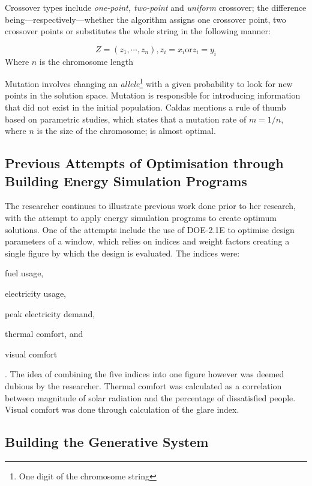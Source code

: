Crossover types include \emph{one-point, two-point} and \emph{uniform} crossover; the difference being---respectively---whether the algorithm assigns one crossover point, two crossover points or substitutes the whole string in the following manner:

\begin{equation}
Z=(z_1,\cdots,z_n), z_i=x_i \text{or} z_i=y_i
\label{eqn:UniformCross}
\end{equation}
\small Where $n$ is the chromosome length
\normalsize

Mutation involves changing an \emph{allele}\footnote{One digit of the chromosome string} with a given probability to look for new points in the solution space. Mutation is responsible for introducing information that did not exist in the initial population. Caldas \cite{caldas01} mentions a rule of thumb based on parametric studies, which states that a mutation rate of $m=1/n$, where $n$ is the size of the chromosome; is almost optimal.

\subsection{Previous Attempts of Optimisation through Building Energy Simulation Programs}

The researcher continues to illustrate previous work done prior to her research, with the attempt to apply energy simulation programs to create optimum solutions. One of the attempts include the use of DOE-2.1E to optimise design parameters of a window, which relies on indices and weight factors creating a single figure by which the design is evaluated. The indices were: \begin{inparaenum} \item fuel usage, \item electricity usage, \item peak electricity demand, \item thermal comfort, and \item visual comfort \end{inparaenum}. The idea of combining the five indices into one figure however was deemed dubious by the researcher. Thermal comfort was calculated as a correlation between magnitude of solar radiation and the percentage of dissatisfied people. Visual comfort was done through calculation of the glare index.

\subsection{Building the Generative System}

